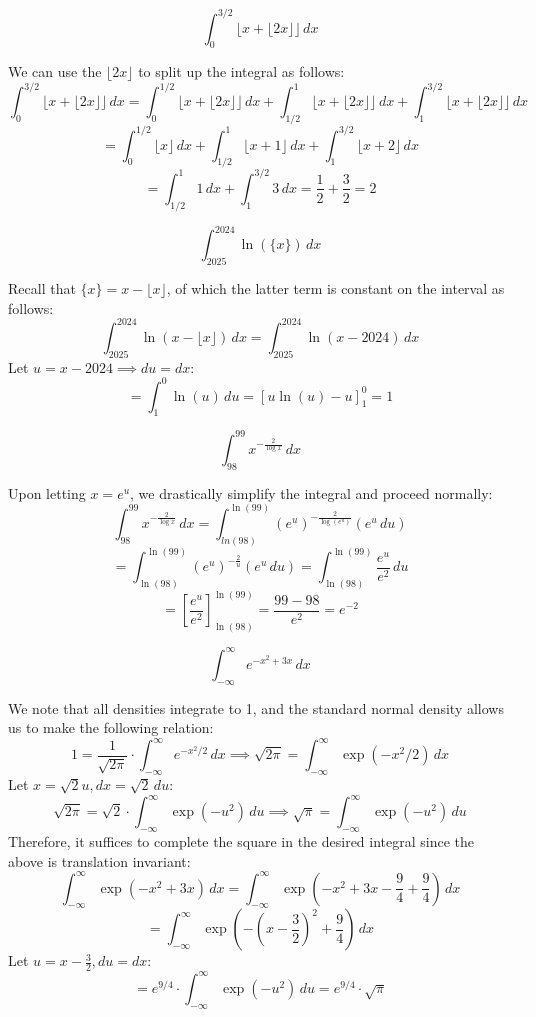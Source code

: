 \begin{questions}
    \question \[ \int_{0}^{3/2} \lfloor x + \lfloor 2x \rfloor \rfloor \,dx \]
    \begin{solution}
        We can use the $\lfloor 2x \rfloor$ to split up the integral as follows:
        \[ \int_{0}^{3/2} \lfloor x + \lfloor 2x \rfloor \rfloor \,dx = \int_{0}^{1/2} \lfloor x + \lfloor 2x \rfloor \rfloor \,dx + \int_{1/2}^{1} \lfloor x + \lfloor 2x \rfloor \rfloor \,dx + \int_{1}^{3/2} \lfloor x + \lfloor 2x \rfloor \rfloor \,dx \]
        \[ = \int_{0}^{1/2} \lfloor x \rfloor \,dx + \int_{1/2}^{1} \lfloor x + 1 \rfloor \,dx + \int_{1}^{3/2} \lfloor x + 2 \rfloor \,dx \]
        \[ = \int_{1/2}^{1} 1 \,dx + \int_{1}^{3/2} 3 \,dx = \frac{1}{2} + \frac{3}{2} = 2 \]
    \end{solution}

    \question \[ \int_{2025}^{2024} \ln(\{x\}) \,dx \]
    \begin{solution}
        Recall that $\{x\} = x - \lfloor x \rfloor$, of which the latter term is constant on the interval as follows:
        \[ \int_{2025}^{2024} \ln(x - \lfloor x \rfloor) \,dx = \int_{2025}^{2024} \ln(x - 2024) \,dx \]
        Let $u = x - 2024 \implies du = dx$:
        \[ = \int_{1}^{0} \ln(u) \,du = \left[ u\ln(u) - u \right]_{1}^{0} = 1 \]
    \end{solution}

    \question \[ \int_{98}^{99} x^{-\frac{2}{\log x}} \,dx \]
    \begin{solution}
        Upon letting $x = e^u$, we drastically simplify the integral and proceed normally:
        \[ \int_{98}^{99} x^{-\frac{2}{\log x}} \,dx = \int_{ln(98)}^{\ln(99)} (e^u)^{-\frac{2}{\log(e^u)}} (e^u \,du) \]
        \[ = \int_{\ln(98)}^{\ln(99)} (e^u)^{-\frac{2}{u}} (e^u \,du) = \int_{\ln(98)}^{\ln(99)} \frac{e^u}{e^2} \,du \]
        \[ = \left[ \frac{e^u}{e^2} \right]_{\ln(98)}^{\ln(99)} = \frac{99 - 98}{e^2} = e^{-2} \]
    \end{solution}

    \question \[ \int_{-\infty}^{\infty} e^{-x^2 + 3x} \,dx \]
    \begin{solution}
        We note that all densities integrate to 1, and the standard normal density allows us to make the following relation:
        \[ 1 = \frac{1}{\sqrt{2\pi}} \cdot \int_{-\infty}^{\infty} e^{-x^2/2} \,dx \implies \sqrt{2\pi} = \int_{-\infty}^{\infty} \exp(-x^2/2) \,dx \]
        Let $x = \sqrt{2}u, dx = \sqrt{2}\,du$:
        \[ \sqrt{2\pi} = \sqrt{2} \cdot \int_{-\infty}^{\infty} \exp(-u^2) \,du \implies \sqrt{\pi} = \int_{-\infty}^{\infty} \exp(-u^2) \,du \]
        Therefore, it suffices to complete the square in the desired integral since the above is translation invariant:
        \[ \int_{-\infty}^{\infty} \exp(-x^2 + 3x) \,dx = \int_{-\infty}^{\infty} \exp\left(-x^2 + 3x - \frac{9}{4} + \frac{9}{4}\right) \,dx \]
        \[ = \int_{-\infty}^{\infty} \exp\left(-\left(x - \frac{3}{2}\right)^2 + \frac{9}{4}\right) \,dx \]
        Let $u = x - \frac{3}{2}, du = dx$:
        \[ = e^{9/4} \cdot \int_{-\infty}^{\infty} \exp(-u^2) \,du = e^{9/4} \cdot \sqrt{\pi} \]
    \end{solution}

\end{questions}

